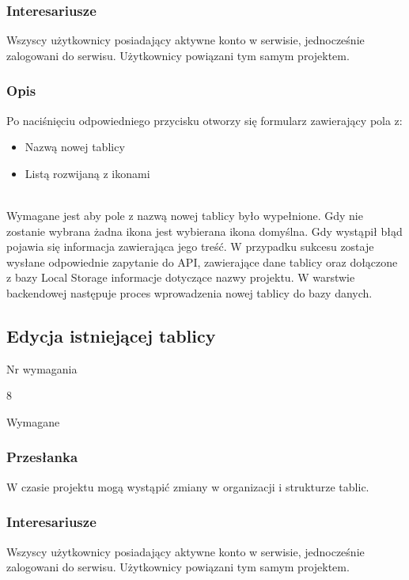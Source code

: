 \documentclass[eng,printmode]{mgr}
\begin{document}
\subsubsection{Interesariusze}
Wszyscy użytkownicy posiadający aktywne konto w serwisie, jednocześnie zalogowani do serwisu. Użytkownicy powiązani tym samym projektem.

\subsubsection{Opis}
Po naciśnięciu odpowiedniego przycisku otworzy się formularz zawierający pola z:
\begin{itemize}
  \item[--] Nazwą nowej tablicy
  \item[--] Listą rozwijaną z ikonami
\end{itemize}
\ \\
Wymagane jest aby pole z nazwą nowej tablicy było wypełnione. Gdy nie zostanie wybrana żadna ikona jest wybierana ikona domyślna. Gdy wystąpił błąd pojawia się informacja zawierająca jego treść. W przypadku sukcesu zostaje wysłane odpowiednie zapytanie do API, zawierające dane tablicy oraz dołączone z bazy Local Storage informacje dotyczące nazwy projektu. W warstwie backendowej następuje proces wprowadzenia nowej tablicy do bazy danych.
\newpage

\subsection{Edycja istniejącej tablicy}
\begin{labeling}{Nr wymagania}
\item [Nr wymagania:] 8
\item [Priorytet:] Wymagane
\end{labeling}

\subsubsection{Przesłanka}
W czasie projektu mogą wystąpić zmiany w organizacji i strukturze tablic. 

\subsubsection{Interesariusze}
Wszyscy użytkownicy posiadający aktywne konto w serwisie, jednocześnie zalogowani do serwisu. Użytkownicy powiązani tym samym projektem.
\end{document}
